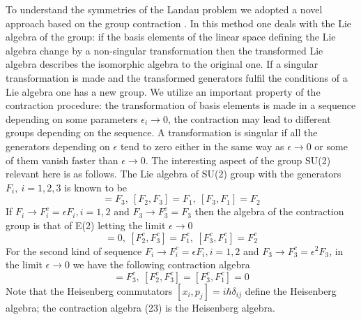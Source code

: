 \documentclass[aps, singlecolumn, showpacs]{revtex4-2}
\begin{document}
To understand the symmetries of the Landau problem we adopted a novel approach \cite{16} based on the group contraction \cite{20}. In
this method one deals with the Lie algebra of the group: if the basis elements of the linear space defining the Lie algebra change by a non-singular transformation then the transformed Lie algebra describes the isomorphic algebra to the original one. If a singular transformation is made and the transformed generators fulfil the conditions of a Lie algebra one has a new group. We utilize an important property of the contraction procedure: the transformation of basis elements is made in a sequence depending on some parameters $\epsilon_i \rightarrow 0$, the contraction may lead to different groups depending on the sequence. A transformation is singular if all the generators depending on $\epsilon$ tend to zero either in the same way as $\epsilon \rightarrow 0$ or some of them vanish faster than $\epsilon \rightarrow 0$. The interesting aspect of the group SU(2) relevant here is as follows. The Lie algebra of SU(2) group with the generators $F_i,~i=1,2,3$ is known to be
\begin{equation}
[F_1, F_2] =F_3, ~ [F_2, F_3] = F_1, ~ [F_3, F_1] = F_2
\end{equation}
If $F_i \rightarrow F_i^c = \epsilon F_i, i=1,2$ and $F_3 \rightarrow F_3^c = F_3$ then the algebra of the contraction group is that of E(2) letting the limit $\epsilon \rightarrow 0$
\begin{equation}
[F_1^c, F_2^c] =0, ~ [F_2^c, F_3^c] = F_1^c, ~ [F_3^c, F_1^c] = F_2^c
\end{equation}
For the second kind of sequence $F_i \rightarrow F_i^c = \epsilon F_i, i=1,2$ and $ F_3 \rightarrow F_3^c= \epsilon^2 F_3$, in the limit $\epsilon \rightarrow 0$ we have the following contraction algebra
\begin{equation}
[F_1^c, F_2^c] = F_3^c, ~ [F_2^c, F_3^c] = [F_3^c, F_1^c]=0
\end{equation}
Note that the Heisenberg commutators $[x_i, p_j] = i\hbar \delta_{ij}$ define the Heisenberg algebra; the contraction algebra (23) is the Heisenberg algebra.
\end{document}
